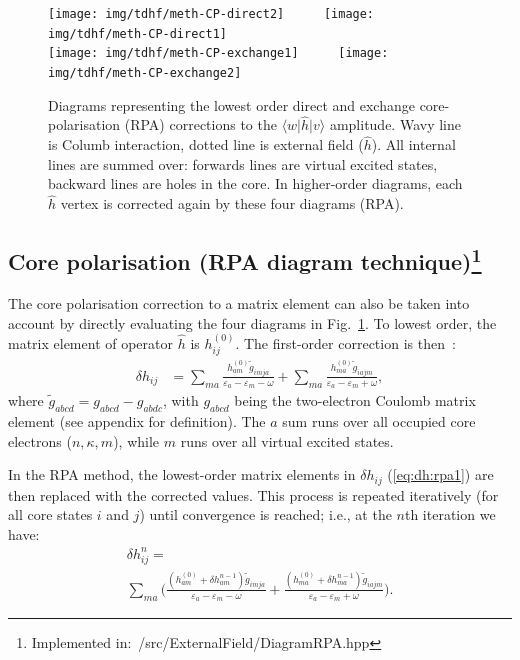 \documentclass[10pt,twocolumn,a4paper]{article}%
\newcommand{\bra}[1]{\ensuremath{\langle #1|}}	%
\newcommand{\ket}[1]{\ensuremath{|#1\rangle}}	%
\def\en{\ensuremath{\varepsilon}}
\renewcommand{\k}{\ensuremath{\kappa}}
\begin{document}
\begin{figure}%
\centering
\texttt{[image: img/tdhf/meth-CP-direct2]}~~~~~
\texttt{[image: img/tdhf/meth-CP-direct1]}\\
\texttt{[image: img/tdhf/meth-CP-exchange1]}~~~~~
\texttt{[image: img/tdhf/meth-CP-exchange2]}
\caption{\small Diagrams representing the lowest order direct and exchange core-polarisation (RPA) corrections to the $\bra{w}\hat h\ket{v}$ amplitude.
Wavy line is Columb interaction, dotted line is external field ($\hat h$). All internal lines are summed over: forwards lines are virtual excited states, backward lines are holes in the core.
In higher-order diagrams, each $\hat h$ vertex is corrected again by these four diagrams (RPA).\label{fig:corePol}}
\end{figure}






\subsection[Core polarisation (RPA diagram technique)]{Core polarisation (RPA diagram technique)\footnote{Implemented in:~/src/ExternalField/DiagramRPA.hpp}\label{sec:RPA-diagram}}

The core polarisation correction to a matrix element can also be taken into account by directly evaluating the four diagrams in Fig.~\ref{fig:corePol}.
To lowest order, the matrix element of operator $\hat h$ is $h_{ij}^{(0)}$. 
The first-order correction is then~\cite{Lindgren1986}:
\begin{align}
\delta h_{ij} &= 
\sum_{ma}\frac{h_{am}^{(0)}\widetilde g_{imja}}{\en_a - \en_m - \omega}
+ \sum_{ma}\frac{h_{ma}^{(0)}\widetilde g_{iajm}}{\en_a - \en_m + \omega},
\label{eq:dh:rpa1}
\end{align}
where
$ \widetilde g_{abcd} =  g_{abcd} -  g_{abdc}$, with 
$g_{abcd}$ being the two-electron Coulomb matrix element (see appendix for definition).
The $a$ sum runs over all occupied core electrons ($n,\k,m$), while $m$ runs over all virtual excited states.

In the RPA method, the lowest-order matrix elements in $\delta h_{ij}$ (\ref{eq:dh:rpa1}) are then replaced with the corrected values. This process is repeated iteratively (for all core states $i$ and $j$) until convergence is reached; i.e., at the $n$th iteration we have:
\begin{multline}
\delta h_{ij}^{n} = \\
\sum_{ma}\Bigg(\frac{(h_{am}^{(0)}+\delta h_{am}^{n-1})\widetilde g_{imja}}{\en_a - \en_m - \omega}
+ \frac{(h_{ma}^{(0)}+\delta h_{ma}^{n-1})\widetilde g_{iajm}}{\en_a - \en_m + \omega}\Bigg).
\end{multline}
\end{document}
